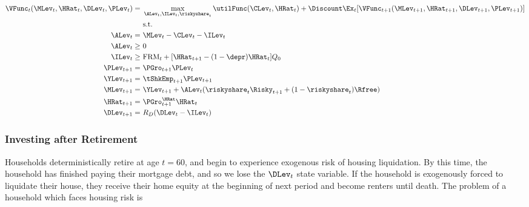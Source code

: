 \documentclass[PortfolioChoiceWithRiskyHousing]{subfiles}
\begin{document}
\begin{equation}
	\begin{split}
		\VFunc_{t}(\MLev_{t}, \HRat_{t}, \DLev_{t}, \PLev_{t}) = &~ \max_{\ALev_{t}, \ILev_{t}, \riskyshare_{t}} \utilFunc(\CLev_{t}, \HRat_{t}) + \Discount \Ex_{t} [\VFunc_{t+1}(\MLev_{t+1}, \HRat_{t+1}, \DLev_{t+1}, \PLev_{t+1})] \\
		&~ \text{s.t.} \\
		\ALev_{t} = &~ \MLev_{t} - \CLev_{t} - \ILev_{t} \\
		\ALev_{t}\ge &~  0 \\
		\ILev_{t} \ge &~ \text{FRM}_{t} + [\HRat_{t+1} - (1-\depr)\HRat_{t} ]Q_{0}\\
		\PLev_{t+1} = &~ \PGro_{t+1} \PLev_{t} \\
		\YLev_{t+1} = &~ \tShkEmp_{t+1}\PLev_{t+1} \\
		\MLev_{t+1} = &~ \YLev_{t+1} + \ALev_{t}(\riskyshare_{t} \Risky_{t+1} + (1-\riskyshare_{t})\Rfree)\\
		\HRat_{t+1} = &~  \PGro^{\HRat}_{t+1} \HRat_{t}\\
		\DLev_{t+1} = &~ R_D(\DLev_{t} - \ILev_{t}) \\
	\end{split}
\end{equation}

\subsubsection{Investing after Retirement}

Households deterministically retire at age $t=60$, and begin to experience exogenous risk of housing liquidation. By this time, the household has finished paying their mortgage debt, and so we lose the $\DLev_{t}$ state variable. If the household is exogenously forced to liquidate their house, they receive their home equity at the beginning of next period and become renters until death. The problem of a household which faces housing risk is
\end{document}
